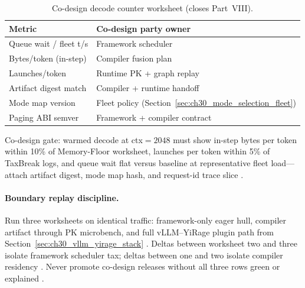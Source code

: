 \begin{table}[t]
\centering
\small
\begin{tabular}{@{}ll@{}}
\toprule
\textbf{Metric} & \textbf{Co-design party owner} \\
\midrule
Queue wait / fleet t/s & Framework scheduler \\
Bytes/token (in-step) & Compiler fusion plan \\
Launches/token & Runtime PK + graph replay \\
Artifact digest match & Compiler + runtime handoff \\
Mode map version & Fleet policy (Section~\ref{sec:ch30_mode_selection_fleet}) \\
Paging ABI semver & Framework + compiler contract \\
\bottomrule
\end{tabular}
\caption{Co-design decode counter worksheet (closes Part~VIII).}
\label{tab:ch30_codesign_benchmark}
\end{table}

\begin{example}
Co-design gate: warmed decode at ctx${=}2048$ must show in-step bytes per token within 10\% of Memory-Floor worksheet, launches per token within 5\% of TaxBreak logs, and queue wait flat versus baseline at representative fleet load---attach artifact digest, mode map hash, and request-id trace slice \citep{memoryfloor2026,taxbreak2026,yirage2026,chen2020compilerbasedhardw,patel2025llminference,kwon2023vllm,liu2024deepseekv3,nvidia2024cudagraphs,dao2022flashattention,amd2024xdna,amd2024aie,dao2023flashdecoding,nvidia2022hopper,semianalysis2024tma,dlbook}.
\end{example}

\paragraph{Boundary replay discipline.} Run three worksheets on identical traffic: framework-only eager hull, compiler artifact through PK microbench, and full vLLM--YiRage plugin path from Section~\ref{sec:ch30_vllm_yirage_stack} \citep{kwon2023vllm,yirage2026,chen2020compilerbasedhardw,patel2025llminference,taxbreak2026,memoryfloor2026,liu2024deepseekv3,nvidia2024cudagraphs,dao2022flashattention,amd2024xdna,amd2024aie,dao2023flashdecoding,nvidia2022hopper,semianalysis2024tma,dlbook}. Deltas between worksheet two and three isolate framework scheduler tax; deltas between one and two isolate compiler residency \citep{patel2025llminference,memoryfloor2026,yirage2026,chen2020compilerbasedhardw,kwon2023vllm,taxbreak2026,liu2024deepseekv3,nvidia2024cudagraphs,dao2022flashattention,amd2024aie,amd2024xdna,dlbook,dao2023flashdecoding,nvidia2022hopper,semianalysis2024tma}. Never promote co-design releases without all three rows green or explained \citep{yirage2026,chen2020compilerbasedhardw,patel2025llminference,kwon2023vllm,dlbook}.

